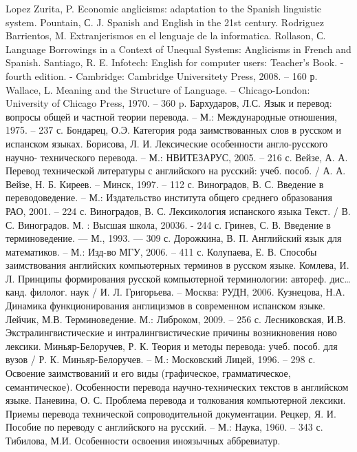 \documentclass[12pt, a4paper, twoside]{report}
\begin{document}
\begin{thebibliography}
 Lopez Zurita, P. Economic anglicisms: adaptation to the Spanish linguistic system.
 Pountain, С. J. Spanish and English in the 21st century.
 Rodriguez Barrientos, M. Extranjerismos en el lenguaje de la informatica. 
 Rollason, С. Language Borrowings in a Context of Unequal Systems: Anglicisms in French and Spanish. 
	Santiago, R. E. Infotech: English for computer users: Teacher's Book. - fourth edition. - Cambridge: Cambridge Universitety Press, 2008. – 160 р.   
	Wallace, L. Meaning and the Structure of Language. – Chicago-London: University of Chicago Press, 1970. – 360 p.
	Бархударов, Л.С. Язык и перевод: вопросы общей и частной теории перевода. – М.: Международные отношения, 1975. – 237 с. 
 Бондарец, О.Э. Категория рода заимствованных слов в русском и испанском языках. 
 Борисова, Л. И. Лексические особенности англо-русского научно-   технического перевода. – М.: НВИТЕЗАРУС, 2005. – 216 с.
 Вейзе, А. А. Перевод технической литературы с английского на русский: учеб. пособ. / А. А. Вейзе, Н. Б. Киреев. – Минск, 1997. – 112 с.
	Виноградов, В. С. Введение в переводоведение. – М.: Издательство  института общего среднего образования РАО, 2001. – 224 с.
	Виноградов, В. С. Лексикология испанского языка Текст. / В. С. Виноградов. М. : Высшая школа, 20036. - 244 с.
	Гринев, С. В. Введение в терминоведение. — М., 1993. — 309 с.  
	Дорожкина, В. П. Английский язык для математиков. – М.: Изд-во МГУ, 2006. – 411 с.
	Колупаева, Е. В. Способы заимствования английских компьютерных терминов в русском языке. 
	Комлева, И. Л. Принципы формирования русской компьютерной терминологии: автореф. дис…канд. филолог. наук / И. Л. Григорьева. – Москва: РУДН, 2006.
	Кузнецова, Н.А. Динамика функционирования англицизмов в  современном испанском языке. 
	Лейчик, М.В. Терминоведение. М.: Либроком, 2009. – 256 с.
	Лесниковская, И.В. Экстралингвистические и интралингвистические причины  возникновения ново лексики. 
	Миньяр-Белоручев, Р. К. Теория и методы перевода: учеб. пособ. для вузов / Р. К. Миньяр-Белоручев. – М.: Московский Лицей, 1996. – 298 с.
	Освоение заимствований и его виды (графическое, грамматическое, семантическое).  
	Особенности перевода научно-технических текстов в английском языке. 
	Паневина, О. С. Проблема перевода и толкования компьютерной лексики. 
	Приемы перевода технической сопроводительной документации.
	Рецкер, Я. И. Пособие по переводу с английского на русский. – М.: Наука, 1960. – 343 с.
	Тибилова, М.И. Особенности освоения иноязычных аббревиатур.     



\end{thebibliography}
\end{document}
